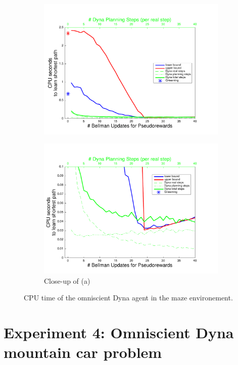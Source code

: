 \documentclass[letterpaper]{article}
\begin{document}
\begin{figure}
\centering
\begin{subfigure}{.4\textwidth}
  \centering
  \includegraphics[width=.95\linewidth]{cpus_vs_PRiterations_omniscientDYNA_toGoal}
  \caption{}
\end{subfigure}
\begin{subfigure}{.4\textwidth}
  \centering
  \includegraphics[width=.95\linewidth]{cpus_vs_PRiterations_omniscientDYNA_toGoal_closeup}
  \caption{Close-up of (a)}
\end{subfigure}
\caption{CPU time of the omniscient Dyna agent in the maze environement.}
\label{fig:S1b}
\end{figure}

\section{Experiment 4: Omniscient Dyna mountain car problem}
\end{document}
